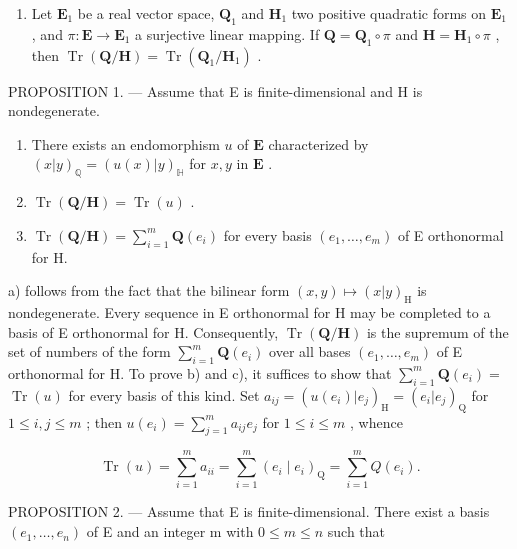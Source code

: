\begin{enumerate}
\def\labelenumi{\arabic{enumi})}
\setcounter{enumi}{1}
\tightlist
\item
  Let \(\mathbf{E}_1\) be a real vector space, \(\mathbf{Q}_1\) and \(\mathbf{H}_1\) two positive quadratic forms on \(\mathbf{E}_1\) , and \(\pi: \mathbf{E} \to \mathbf{E}_1\) a surjective linear mapping. If \(\mathbf{Q} = \mathbf{Q}_1 \circ \pi\) and \(\mathbf{H} = \mathbf{H}_1 \circ \pi\) , then \(\operatorname{Tr}(\mathbf{Q} / \mathbf{H}) = \operatorname{Tr}(\mathbf{Q}_1 / \mathbf{H}_1)\) .
\end{enumerate}

PROPOSITION 1. --- Assume that E is finite-dimensional and H is nondegenerate.

\begin{enumerate}
\def\labelenumi{\alph{enumi})}
\item
  There exists an endomorphism \(u\) of \(\mathbf{E}\) characterized by \((x|y)_{\mathbb{Q}} = (u(x)|y)_{\mathbb{H}}\) for \(x, y\) in \(\mathbf{E}\) .
\item
  \(\operatorname{Tr}(\mathbf{Q} / \mathbf{H}) = \operatorname{Tr}(u)\) .
\item
  \(\operatorname{Tr}(\mathbf{Q} / \mathbf{H}) = \sum_{i=1}^{m} \mathbf{Q}(e_i)\) for every basis \((e_1, \ldots, e_m)\) of E orthonormal for H.
\end{enumerate}

a) follows from the fact that the bilinear form \((x,y)\mapsto (x|y)_{\mathrm{H}}\) is nondegenerate. Every sequence in E orthonormal for H may be completed to a basis of E orthonormal for H. Consequently, \(\operatorname {Tr}(\mathbf{Q} / \mathbf{H})\) is the supremum of the set of numbers of the form \(\sum_{i = 1}^{m}\mathbf{Q}(e_i)\) over all bases \((e_1,\ldots ,e_m)\) of E orthonormal for H. To prove b) and c), it suffices to show that \(\sum_{i = 1}^{m}\mathbf{Q}(e_i) =\) \(\operatorname {Tr}(u)\) for every basis of this kind. Set \(a_{ij} = (u(e_i)|e_j)_{\mathrm{H}} = (e_i|e_j)_{\mathrm{Q}}\) for \(1\leqslant i,j\leqslant m\) ; then \(u(e_i) = \sum_{j = 1}^{m}a_{ij}e_j\) for \(1\leqslant i\leqslant m\) , whence

\[
\operatorname{Tr} (u) = \sum_ {i = 1} ^ {m} a _ {i i} = \sum_ {i = 1} ^ {m} \left(e _ {i} \mid e _ {i}\right) _ {\mathrm{Q}} = \sum_ {i = 1} ^ {m} Q \left(e _ {i}\right).\tag{Q.E.D.}
\]

PROPOSITION 2. --- Assume that E is finite-dimensional. There exist a basis \((e_{1},\ldots,e_{n})\) of E and an integer m with \(0\leqslant m\leqslant n\) such that

